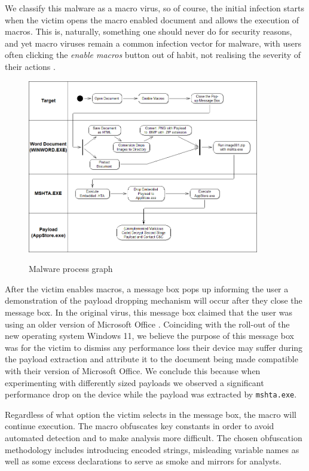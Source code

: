 We classify this malware as a macro virus, so of course, the initial infection starts when the victim opens the macro
enabled document and allows the execution of macros. This is, naturally, something one should never do for security
reasons, and yet macro viruses remain a common infection vector for malware, with users often clicking the \emph{enable
macros} button out of habit, not realising the severity of their actions \cite{macro-viruses-users}.

\begin{figure}[H]
  \centering
  \includegraphics[width=0.9\textwidth]{figures/malware-process-graph.png}
  \label{process-graph}
  \caption{Malware process graph}
\end{figure}

After the victim enables macros, a message box pops up informing the user a demonstration of the payload dropping
mechanism will occur after they close the message box. In the original virus, this message box claimed that the user 
was using an older version of Microsoft Office \cite{jazi-article}. Coinciding with the roll-out of the new operating 
system Windows 11, we believe the purpose of this message box was for the victim to dismiss any performance loss their 
device may suffer during the payload extraction and attribute it to the document being made compatible with their version 
of Microsoft Office. 
We conclude this because when experimenting with differently sized payloads we observed a significant performance drop
on the device while the payload was extracted by \verb+mshta.exe+.

Regardless of what option the victim selects in the message box, the macro will continue execution. The macro obfuscates
key constants in order to avoid automated detection and to make analysis more difficult. The chosen obfuscation
methodology includes introducing encoded strings, misleading variable names as well as some excess declarations to 
serve as smoke and mirrors for analysts.
\clearpage %

